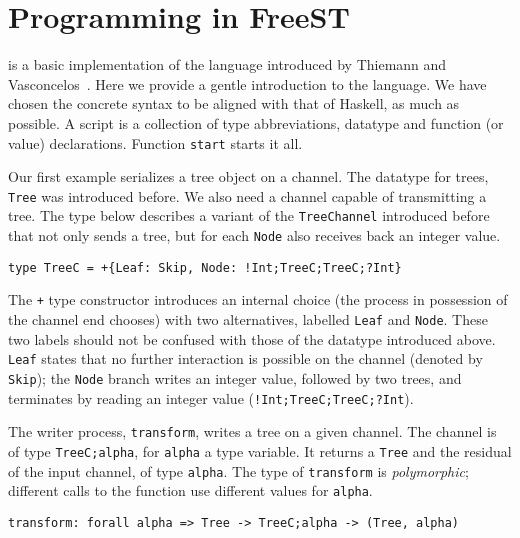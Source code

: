 \section{Programming in FreeST}
\label{sec:programming}

\freest{} is a basic implementation of the language introduced by
Thiemann and Vasconcelos~\cite{DBLP:conf/icfp/ThiemannV16}. Here we
provide a gentle introduction to the language.
%
We have chosen the concrete syntax to be aligned with that of Haskell,
as much as possible. A \freest{} script is a collection of type
abbreviations, datatype and function (or value) declarations. Function
\lstinline|start| starts it all.

Our first example serializes a tree object on a channel. The datatype
for trees, \lstinline|Tree| was introduced before.  We also need a
channel capable of transmitting a tree. The type below describes a
variant of the \lstinline|TreeChannel| introduced before that not only
sends a tree, but for each \lstinline|Node| also receives back an
integer value.
%
\begin{lstlisting}
type TreeC = +{Leaf: Skip, Node: !Int;TreeC;TreeC;?Int}
\end{lstlisting}

The \lstinline|+| type constructor introduces an internal choice (the
process in possession of the channel end chooses) with two
alternatives, labelled \lstinline|Leaf| and \lstinline|Node|. These
two labels should not be confused with those of the datatype
introduced above. \lstinline|Leaf| states that no further interaction
is possible on the channel (denoted by \lstinline|Skip|); the
\lstinline|Node| branch writes an integer value, followed by two
trees, and terminates by reading an integer value
(\lstinline|!Int;TreeC;TreeC;?Int|).

The writer process, \lstinline|transform|, writes a tree on a given
channel. The channel is of type \lstinline|TreeC;alpha|, for
\lstinline|alpha| a type variable. It returns a \lstinline|Tree| and
the residual of the input channel, of type \lstinline|alpha|. The type
of \lstinline|transform| is \emph{polymorphic}; different calls to the
function use different values for \lstinline|alpha|.

\begin{lstlisting}
transform: forall alpha => Tree -> TreeC;alpha -> (Tree, alpha)
\end{lstlisting}

